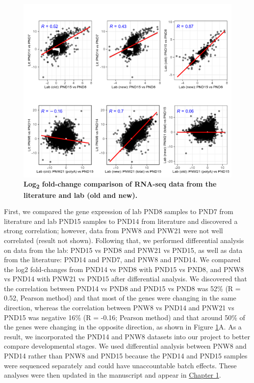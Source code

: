 \documentclass[12pt,twoside]{reedthesis}
\begin{document}
\begin{figure}[htbp]

{\centering \includegraphics{thesis_files/figure-latex/dn1-1} 

}

\caption[Log\textsubscript{2} fold-change comparison of RNA-seq data
from the literature and lab (old and new)]{\textbf{Log\textsubscript{2} fold-change comparison of RNA-seq data from the literature and lab (old and new).}}\label{fig:dn1}
\end{figure}
First, we compared the gene expression of lab PND8 samples to PND7 from
literature and lab PND15 samples to PND14 from literature and discovered
a strong correlation; however, data from PNW8 and PNW21 were not well
correlated (result not shown). Following that, we performed differential
analysis on data from the lab: PND15 vs PND8 and PNW21 vs PND15, as well
as data from the literature: PND14 and PND7, and PNW8 and PND14. We
compared the log2 fold-changes from PND14 vs PND8 with PND15 vs PND8,
and PNW8 vs PND14 with PNW21 vs PND15 after differential analysis. We
discovered that the correlation between PND14 vs PND8 and PND15 vs PND8
was 52\% (R = 0.52, Pearson method) and that most of the genes were
changing in the same direction, whereas the correlation between PNW8 vs
PND14 and PNW21 vs PND15 was negative 16\% (R = -0.16; Pearson method)
and that around 50\% of the genes were changing in the opposite
direction, as shown in Figure \ref{fig:dn1}A. As a result, we incorporated the PND14
and PNW8 datasets into our project to better compare developmental
stages. We used differential analysis between PNW8 and PND14 rather than
PNW8 and PND15 because the PND14 and PND15 samples were sequenced
separately and could have unaccountable batch effects. These analyses
were then updated in the manuscript and appear in \protect\hyperlink{chapter1}{Chapter
1}.
\end{document}
